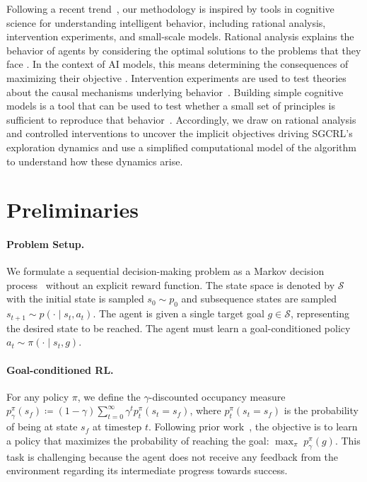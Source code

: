 \documentclass{article}
\begin{document}
Following a recent trend~\citep{hamrick2020levels,binz2023using,frank2023baby,ivanova2025evaluate,ku2025using}, our methodology is inspired by tools in cognitive science
for understanding intelligent behavior, including rational analysis, intervention experiments, and small-scale models. Rational analysis explains the behavior of agents by considering the optimal solutions to the problems that they face \citep{anderson1990adaptive}. In the context of AI models, this means determining the consequences of maximizing their objective \citep{mccoy2024embers}. Intervention experiments are used to test theories about the causal mechanisms underlying behavior~\citep{bower1989experimental}.  Building simple cognitive models is a tool that can be used to test whether a small set of principles is sufficient to reproduce that behavior~\citep{mcclelland2009place}. Accordingly, we draw on rational analysis and controlled interventions to uncover the implicit objectives driving SGCRL's exploration dynamics and use a simplified computational model of the algorithm to understand how these dynamics arise.






\section{Preliminaries}\label{sec:prelim}

\paragraph{Problem Setup.} We formulate a sequential decision-making problem as a Markov decision process~\citep{bellman1957markovian,Puterman94} without an explicit reward function. The state space is denoted by $\mathcal{S}$ with the initial state is sampled $s_0 \sim p_0$ and subsequence states are sampled $s_{t+1} \sim p(\cdot \mid s_t, a_t)$. The agent is given a single target goal $g \in \mathcal{S}$, representing the desired state to be reached. The agent must learn a goal-conditioned policy $a_t \sim \pi(\cdot \mid s_t, g)$.



\paragraph{Goal-conditioned RL.}
For any policy $\pi$, we define the $\gamma$-discounted occupancy measure~\citep{sutton1999policy} $
p_{\gamma}^\pi(s_f) \coloneqq (1-\gamma)\sum_{t=0}^\infty \gamma^t p_t^\pi(s_t = s_f)$, where $p_t^\pi(s_t = s_f)$ is the probability of being at state $s_f$ at timestep $t$. Following prior work~\citep{blier2021learning,chane2021goal,eysenbach2022contrastive}, the objective is to learn a policy that maximizes the probability of reaching the goal: $\max_\pi \; p_{\gamma}^\pi(g)$.
This task is challenging because the agent does not receive any feedback from the environment regarding its intermediate progress towards success.
\end{document}
